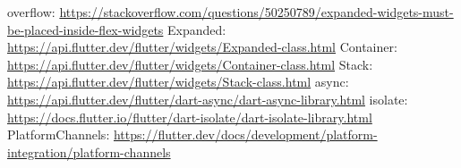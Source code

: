 \documentclass[12pt]{article}
\begin{document}
\begin{thebibliography}{99}
   overflow: \url{https://stackoverflow.com/questions/50250789/expanded-widgets-must-be-placed-inside-flex-widgets}
   Expanded: \url{https://api.flutter.dev/flutter/widgets/Expanded-class.html}
   Container: \url{https://api.flutter.dev/flutter/widgets/Container-class.html}
   Stack: \url{https://api.flutter.dev/flutter/widgets/Stack-class.html}
   async: \url{https://api.flutter.dev/flutter/dart-async/dart-async-library.html}
   isolate: \url{https://docs.flutter.io/flutter/dart-isolate/dart-isolate-library.html}
   PlatformChannels: \url{https://flutter.dev/docs/development/platform-integration/platform-channels}
\end{thebibliography}
\end{document}
